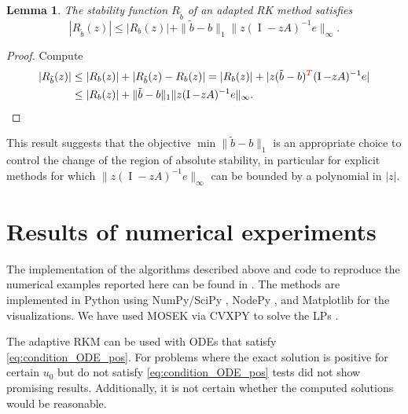\documentclass[a4paper]{article}
\numberwithin{equation}{section}
\theoremstyle{plain}
\newtheorem{lemma}[theorem]{Lemma}
\theoremstyle{definition}
\numberwithin{theorem}{section}
\newcommand{\1}{\mathbbm{1}}
\newcommand{\I}{\operatorname{I}}
\newcommand{\bt}{\tilde{b}}
\newcommand{\revA}[1]{{\color{red}#1}}
\begin{document}
\begin{lemma}
  The stability function $R_{\bt}$ of an adapted RK method
  satisfies
  \begin{equation}
    | R_{\bt}(z) |
    \le
    | R_{b}(z) |
    + \| \bt - b \|_1 \| z (\I - z A)^{-1} e \|_\infty.
  \end{equation}
\end{lemma}
\begin{proof}
  Compute
  \begin{equation}
  \label{eq:proof-of-lemma-free-adaptation}
  \begin{aligned}
    | R_{\bt}(z) |
    &\le
    | R_{b}(z) |
    + | R_{\bt}(z) - R_{b}(z) |
    =
    | R_{b}(z) |
    + | z (\bt - b)\revA{^T} (\I - z A)^{-1} e|
    \\
    &\le
    | R_{b}(z) |
    + \| \bt - b \|_1 \| z (\I - z A)^{-1} e \|_\infty.
  \end{aligned}
  \end{equation}
\end{proof}
This result suggests that the objective $\min \| \bt - b \|_1 $ is an
appropriate choice to control the change of the region of absolute stability,
in particular for explicit methods for which
$\| z (\I - z A)^{-1} e \|_\infty$ can be bounded by a polynomial
in $|z|$.


\section{Results of numerical experiments}\label{sec:Numeric_Results}

The implementation of the algorithms described above and code to
reproduce the numerical examples reported here can be found in
\cite{nusslein2020positivityRepro}.
The methods are implemented in Python using NumPy/SciPy
\cite{virtanen2020scipy}, NodePy \cite{nodepy08}, and
Matplotlib \cite{hunter2007matplotlib} for the visualizations.
We have used MOSEK \cite{mosek} via CVXPY to solve the LPs
\cite{cvxpy, cvxpy_rewriting}.

The adaptive RKM can be used with ODEs that satisfy \eqref{eq:condition_ODE_pos}.
For problems where the exact solution is positive for certain $u_0$ but do not satisfy \eqref{eq:condition_ODE_pos} tests did not show promising results. Additionally, it is not certain whether the computed solutions would be reasonable.
\end{document}
